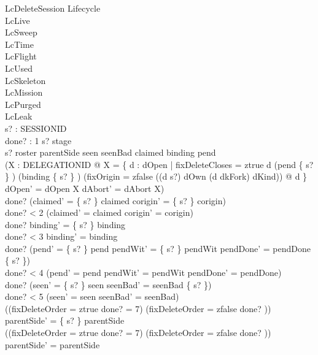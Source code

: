 \documentclass[a4paper,10pt,fleqn]{article}
\begin{document}
\begin{schema}{LcDeleteSession}
\Delta Lifecycle \\
\Xi LcLive \\
\Xi LcSweep \\
\Xi LcTime \\
\Xi LcFlight \\
\Xi LcUsed \\
\Xi LcSkeleton \\
\Xi LcMission \\
\Xi LcPurged \\
\Xi LcLeak \\
s? : SESSIONID \\
done? : 1 
\where
s? \notin \dom stage \\
s? \in roster \cup \dom parentSide \cup \dom seen \cup seenBad \cup \dom claimed \cup \dom binding \cup \dom pend \\
(\exists X : \power DELEGATIONID @ X = \{ d : dOpen | fixDeleteCloses = ztrue \land d \in (pend \limg \{ s? \} \rimg) \cup (binding \limg \{ s? \} \rimg) \land (fixOrigin = zfalse \lor ((d \mapsto s?) \in dOwn \land (d \mapsto dkFork) \in dKind)) @ d \} \land dOpen' = dOpen \setminus X \land dAbort' = dAbort \cup X) \\
done?  \implies (claimed' = \{ s? \} \ndres claimed \land corigin' = \{ s? \} \ndres corigin) \\
done? < 2 \implies (claimed' = claimed \land corigin' = corigin) \\
done?  \implies binding' = \{ s? \} \ndres binding \\
done? < 3 \implies binding' = binding \\
done?  \implies (pend' = \{ s? \} \ndres pend \land pendWit' = \{ s? \} \ndres pendWit \land pendDone' = pendDone \setminus \{ s? \}) \\
done? < 4 \implies (pend' = pend \land pendWit' = pendWit \land pendDone' = pendDone) \\
done?  \implies (seen' = \{ s? \} \ndres seen \land seenBad' = seenBad \setminus \{ s? \}) \\
done? < 5 \implies (seen' = seen \land seenBad' = seenBad) \\
((fixDeleteOrder = ztrue \land done? = 7) \lor (fixDeleteOrder = zfalse \land done? )) \implies parentSide' = \{ s? \} \ndres parentSide \\
\lnot ((fixDeleteOrder = ztrue \land done? = 7) \lor (fixDeleteOrder = zfalse \land done? )) \implies parentSide' = parentSide \\

\end{schema}
\end{document}
